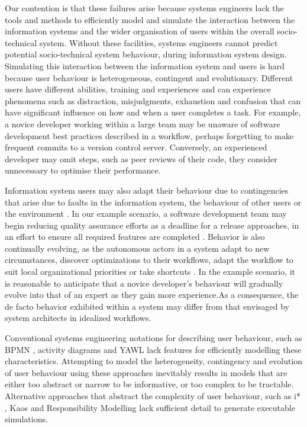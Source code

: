 \documentclass{llncs}
\begin{document}
Our contention is that these failures arise because systems engineers lack the tools and methods to efficiently model
and simulate the interaction between the information systems and the wider organisation of users within the overall
socio-technical system.  Without these facilities, systems engineers cannot predict potential socio-technical system
behaviour, during information system design. Simulating this interaction between the information system and users is
hard because user behaviour is heterogeneous, contingent and evolutionary.  Different users have different abilities,
training and experiences and can experience phenomena such as distraction, misjudgments, exhaustion and confusion that
can have significant influence on how and when a user completes a task.  For example, a novice developer working within
a large team may be unaware of software development best practices described in a workflow, perhaps forgetting to make
frequent commits to a version control server.  Conversely, an experienced developer may omit steps, such as peer reviews
of their code, they consider unnecessary to optimise their performance.

Information system users may also adapt their behaviour due to contingencies that arise due to faults in the information
system, the behaviour of other users or the environment \citep{sommerville09deriving}.  In our example scenario, a
software development team may begin reducing quality assurance efforts as a deadline for a release approaches, in an
effort to ensure all required features are completed \citep{beck02test}. Behavior is also continually evolving, as the
autonomous actors in a system adapt to new circumstances, discover optimizations to their workflows, adapt the workflow
to suit local organizational priorities or take shortcuts
\citep{anderson04heterogeneous,bonen79evolutionary,lyytinen2008explaining}.  In the example scenario, it is reasonable
to anticipate that a novice developer's behaviour will gradually evolve into that of an expert as they gain more
experience.As a consequence, the de facto behavior exhibited within a system may differ from that envisaged by system
architects in idealized workflows.

Conventional systems engineering notations for describing user behaviour, such as BPMN \citep{omg2011omgbpmn}, activity
diagrams \citep{omg07omguml} and YAWL \citep{hofstede2010yawl} lack features for efficiently modelling these
characteristics.  Attempting to model the heterogeneity, contingency and evolution of user behaviour using these
approaches inevitably results in models that are either too abstract or narrow to be informative, or too complex to be
tractable.  Alternative approaches that abstract the complexity of user behaviour, such as i* \citep{yu1995social},
Kaos \citep{werneck2009goreistarkaos} and Responsibility Modelling \citep{sommerville09deriving} lack sufficient detail to
generate executable simulations.
\end{document}
